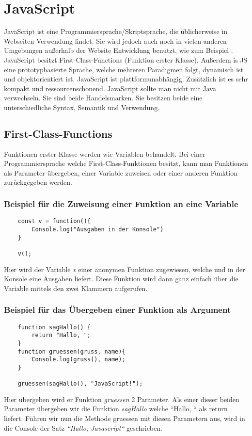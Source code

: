 \section{JavaScript}
\label{js}

JavaScript ist eine Programmiersprache/Skriptsprache, die üblicherweise in Webseiten Verwendung 
findet. Sie wird jedoch auch noch in vielen anderen Umgebungen außerhalb der Website Entwicklung
benutzt, wie zum Beispiel . 
JavaScript besitzt First-Class-Functions (Funktion erster Klasse). 
Außerdem is JS eine prototypbasierte Sprache, welche mehreren Paradigmen folgt, dynamisch ist und 
objektorientiert ist. JavaScript ist plattformunabhängig. Zusätzlich ist es sehr kompakt und 
ressourcenschonend. JavaScript sollte man nicht mit Java verwechseln. Sie sind beide Handelsmarken. 
Sie besitzen beide eine unterschiedliche Syntax, Semantik und Verwendung.~\cite{JS}

\subsection{First-Class-Functions}
Funktionen erster Klasse werden wie Variablen behandelt. Bei einer Programmiersprache welche 
First-Class-Funktionen besitzt, kann man Funktionen als Parameter übergeben, einer Variable 
zuweisen oder einer anderen Funktion zurückgegeben werden.~\cite{First-Class-Funktion}

\subsubsection{Beispiel für die Zuweisung einer Funktion an eine Variable}
\begin{lstlisting}
    const v = function(){
        Console.log("Ausgaben in der Konsole")
    }

    v();
\end{lstlisting}
Hier wird der Variable \textit{v} einer anonymen Funktion zugewiesen, welche und in der Konsole 
eine Ausgaben liefert. Diese Funktion wird dann ganz einfach über die Variable mittels den zwei 
Klammern aufgerufen.


\subsubsection{Beispiel für das Übergeben einer Funktion als Argument}
\begin{lstlisting}
    function sagHallo() {
        return "Hallo, ";
    }
    function gruessen(gruss, name){
        Console.log(gruss(), name);
    }

    gruessen(sagHallo(), "JavaScript!");
\end{lstlisting}
Hier übergeben wird er Funktion \textit{gruessen} 2 Parameter. Als einer dieser beiden Parameter 
übergeben wir die Funktion \textit{sagHallo} welche ``Hallo, `` als return liefert. Führen wir nun 
die Methode gruessen mit diesen Parametern aus, wird in die Console der Satz 
\textit{``Hallo, Javascript``} geschrieben.

